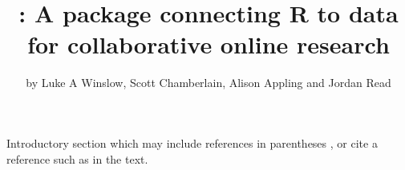 \title{: A package connecting R to data for collaborative online research}
\author{by Luke A Winslow, Scott Chamberlain, Alison Appling and Jordan Read}

\maketitle


Introductory section which may include references in parentheses
\citep{R}, or cite a reference such as \citet{R} in the text.












\address{Luke A Winslow\\
  U.S. Geological Survey Center for Integrated Data Analytics\\
  Middleton, Wisconsin\\
  USA\\}

\address{Scott Chamberlain\\
  Affiliation\\
  Address\\
  Country\\}

\address{Alison Appling\\
  U.S. Geological Survey Center for Integrated Data Analytics\\
  Middleton, Wisconsin\\
  USA\\}

\address{Jordan S Read\\
  U.S. Geological Survey Center for Integrated Data Analytics\\
  Middleton, Wisconsin\\
  USA\\}



